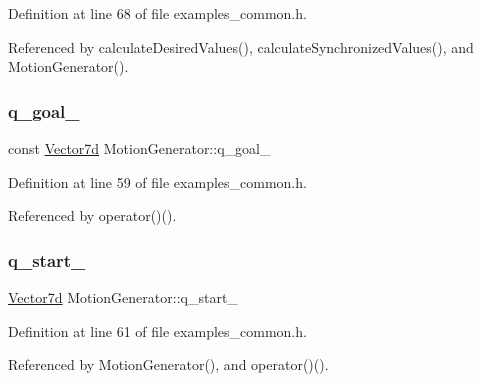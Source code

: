 Definition at line 68 of file examples\+\_\+common.\+h.



Referenced by calculate\+Desired\+Values(), calculate\+Synchronized\+Values(), and Motion\+Generator().

\mbox{\label{classMotionGenerator_a181e3ac9ca9d23a813e06a69e4583ec7}} 
\subsubsection{\texorpdfstring{q\+\_\+goal\+\_\+}{q\_goal\_}}
{\footnotesize\ttfamily const \hyperlink{classMotionGenerator_a499bd17d3a5c7583b4c06923f532185d}{Vector7d} Motion\+Generator\+::q\+\_\+goal\+\_\+\hspace{0.3cm}{\ttfamily [private]}}



Definition at line 59 of file examples\+\_\+common.\+h.



Referenced by operator()().

\mbox{\label{classMotionGenerator_a11a7cfc3fa6c19202c7dcc2f5282046e}} 
\subsubsection{\texorpdfstring{q\+\_\+start\+\_\+}{q\_start\_}}
{\footnotesize\ttfamily \hyperlink{classMotionGenerator_a499bd17d3a5c7583b4c06923f532185d}{Vector7d} Motion\+Generator\+::q\+\_\+start\+\_\+\hspace{0.3cm}{\ttfamily [private]}}



Definition at line 61 of file examples\+\_\+common.\+h.



Referenced by Motion\+Generator(), and operator()().

\mbox{\label{classMotionGenerator_a0b580a9e6904d925146081c870f76266}} 
